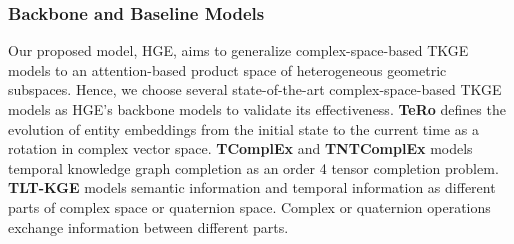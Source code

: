 \documentclass[letterpaper]{article} %
\begin{document}





\subsubsection{Backbone and Baseline Models}
Our proposed model, HGE, aims to generalize complex-space-based TKGE models to an attention-based product space of heterogeneous geometric subspaces. Hence, we choose several state-of-the-art complex-space-based TKGE models as HGE's backbone models to validate its effectiveness. \textbf{TeRo} \cite{xu2020tero} defines the evolution of entity embeddings from the initial state to the current time as a rotation in complex vector space. \textbf{TComplEx} and \textbf{TNTComplEx} \cite{tcomplexlacroix2020tensor} models temporal knowledge graph completion as an order 4 tensor completion problem. \textbf{TLT-KGE} \cite{tltcomplexzhang2022along} models semantic
information and temporal information as different parts of complex space or quaternion space.
Complex or quaternion operations exchange information between different
parts.
\end{document}
